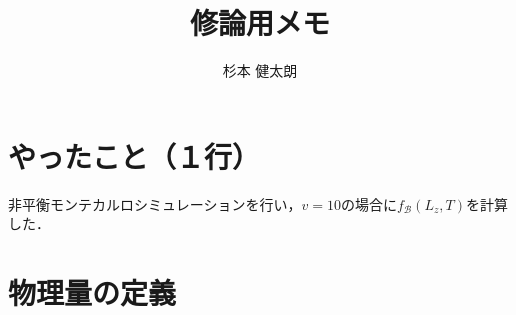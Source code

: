\documentclass[a4paper]{jsarticle}
\title{修論用メモ}
\author{杉本 健太朗}
\begin{document}
	\maketitle

	
	\section{やったこと（１行）}
	
	非平衡モンテカルロシミュレーションを行い，$v=10$の場合に$f_{\mathcal{B}}(L_{z}, T)$を計算した．
	
	\section{物理量の定義}
	
\end{document}
